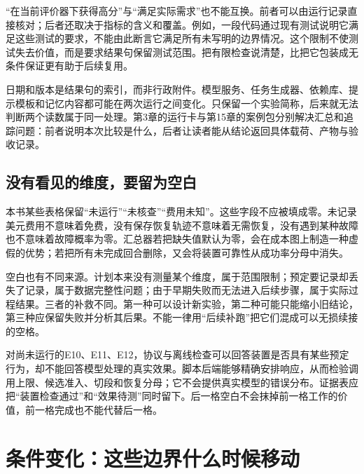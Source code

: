 “在当前评价器下获得高分”与“满足实际需求”也不能互换。前者可以由运行记录直接核对；后者还取决于指标的含义和覆盖。例如，一段代码通过现有测试说明它满足这些测试的要求，不能由此断言它满足所有未写明的边界情况。这个限制不使测试失去价值，而是要求结果句保留测试范围。把有限检查说清楚，比把它包装成无条件保证更有助于后续复用。

日期和版本是结果句的索引，而非行政附件。模型服务、任务生成器、依赖库、提示模板和记忆内容都可能在两次运行之间变化。只保留一个实验简称，后来就无法判断两个读数属于同一处理。第3章的运行卡与第15章的案例包分别解决汇总和追踪问题：前者说明本次比较是什么，后者让读者能从结论返回具体载荷、产物与验收记录。

\subsection{没有看见的维度，要留为空白}

本书某些表格保留“未运行”“未核查”“费用未知”。这些字段不应被填成零。未记录美元费用不意味着免费，没有保存恢复轨迹不意味着无需恢复，没有遇到某种故障也不意味着故障概率为零。汇总器若把缺失值默认为零，会在成本图上制造一种虚假的优势；若把所有未完成回合删除，又会将装置可靠性从成功率分母中消失。

空白也有不同来源。计划本来没有测量某个维度，属于范围限制；预定要记录却丢失了记录，属于数据完整性问题；由于早期失败而无法进入后续步骤，属于实际过程结果。三者的补救不同。第一种可以设计新实验，第二种可能只能缩小旧结论，第三种应保留失败并分析其后果。不能一律用“后续补跑”把它们混成可以无损续接的空格。

对尚未运行的E10、E11、E12，协议与离线检查可以回答装置是否具有某些预定行为，却不能回答模型处理的真实效果。脚本后端能够精确安排响应，从而检验调用上限、候选准入、切段和恢复分母；它不会提供真实模型的错误分布。证据表应把“装置检查通过”和“效果待测”同时留下。后一格空白不会抹掉前一格工作的价值，前一格完成也不能代替后一格。

\section{条件变化：这些边界什么时候移动}
\label{sec:ch16-conditions}

